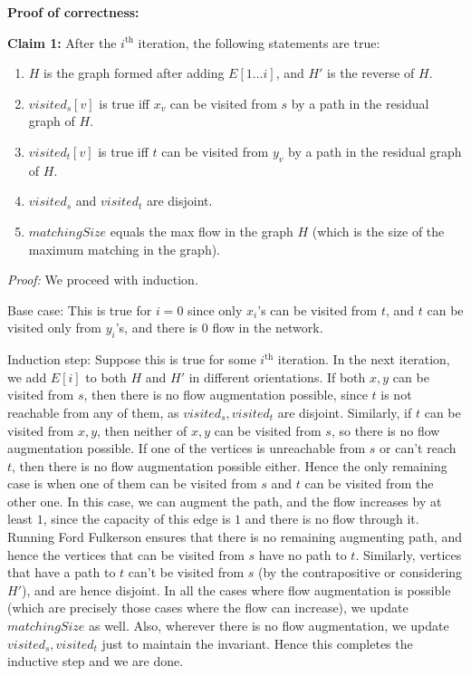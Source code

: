 \documentclass[answers]{exam}
\begin{document}
\begin{questions}
\begin{solution}
    \textbf{Proof of correctness:}

    \textbf{Claim 1:} After the $i^\mathrm{th}$ iteration, the following statements are true:
        \begin{enumerate}
            \item $H$ is the graph formed after adding $E[1\ldots i]$, and $H'$ is the reverse of $H$.
            \item $visited_s[v]$ is true iff $x_v$ can be visited from $s$ by a path in the residual graph of $H$.
            \item $visited_t[v]$ is true iff $t$ can be visited from $y_v$ by a path in the residual graph of $H$.
            \item $visited_s$ and $visited_t$ are disjoint.
            \item $matchingSize$ equals the max flow in the graph $H$ (which is the size of the maximum matching in the graph).
        \end{enumerate}
    
    \textit{Proof:} We proceed with induction.

    Base case: This is true for $i = 0$ since only $x_i$'s can be visited from $t$, and $t$ can be visited only from $y_i$'s, and there is 0 flow in the network.

    Induction step: Suppose this is true for some $i^\mathrm{th}$ iteration. In the next iteration, we add $E[i]$ to both $H$ and $H'$ in different orientations. If both $x, y$ can be visited from $s$, then there is no flow augmentation possible, since $t$ is
    not reachable from any of them, as $visited_s, visited_t$ are disjoint. Similarly, if $t$ can be visited from $x, y$, then neither of $x, y$ can be visited from $s$, so there is no flow
    augmentation possible. If one of the vertices is unreachable from $s$ or can't reach $t$, then there is no flow augmentation possible either. Hence the only remaining case is when one of them can be visited from $s$ and $t$ can be visited from the other one. In this case, we can augment the path, and the flow
    increases by at least $1$, since the capacity of this edge is $1$ and there is no flow through it. Running Ford Fulkerson ensures that there is no remaining augmenting path, and hence the
    vertices that can be visited from $s$ have no path to $t$. Similarly, vertices that have a path to $t$ can't be visited from $s$ (by the contrapositive or considering $H'$), and are hence
    disjoint.
    In all the cases where flow augmentation is possible (which are precisely those cases where the flow can increase), we update $matchingSize$ as well. Also, wherever there is no flow augmentation,
    we update $visited_s, visited_t$ just to maintain the invariant.
    Hence this completes the inductive step and we are done.


\end{solution}
\end{questions}
\end{document}

